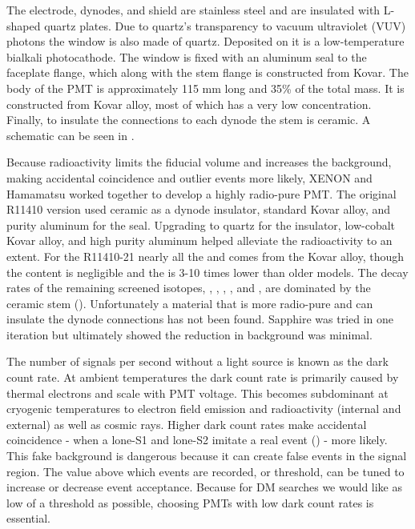 The electrode, dynodes, and shield are stainless steel and are insulated with L-shaped quartz plates.  Due to quartz's transparency to
vacuum ultraviolet (VUV) photons the window is also made of quartz.  Deposited on it is a low-temperature bialkali
photocathode.  The window is fixed with an aluminum seal to the faceplate flange, which along with the stem flange is constructed from
Kovar.  The body of the PMT is approximately 115 mm long and 35\% of the total mass.  It is constructed from Kovar alloy, most of which
has a very low  concentration.  Finally, to insulate the connections to each dynode the stem is ceramic.  A schematic can be
seen in .  

Because radioactivity limits the fiducial volume and increases the background, making accidental coincidence and outlier events more
likely, XENON and Hamamatsu worked together to develop a highly radio-pure PMT.  The original R11410 version used ceramic as a dynode
insulator, standard Kovar alloy, and purity aluminum for the seal.  Upgrading to quartz for the insulator, low-cobalt Kovar alloy, and
high purity aluminum helped alleviate
the radioactivity to an extent.  For the R11410-21 nearly all the  and  comes from the Kovar alloy, though the 
content is negligible and the  is 3-10 times lower than older models.  The decay rates of the remaining screened isotopes,
,
, , , and , are dominated by the ceramic stem ().  Unfortunately a
material that is more radio-pure and can insulate the dynode connections has not been found.  Sapphire was tried in one iteration but
ultimately showed the reduction in background was minimal.

The number of signals per second without a light source is known as the dark count rate.  At ambient temperatures the dark count rate
is primarily caused by thermal electrons and scale with PMT voltage.  This becomes subdominant at
cryogenic temperatures to electron field emission and radioactivity (internal and external) as well as cosmic rays.  Higher dark count
rates make accidental coincidence - when a lone-S1 and lone-S2 imitate a real event () - more likely.  This
fake background is dangerous because it can create false events in the signal region.  The value above which events are recorded, or
threshold, can be tuned to increase or decrease event acceptance.  Because
for DM searches we would like as low of a threshold as possible, choosing PMTs with low dark count rates is essential.

